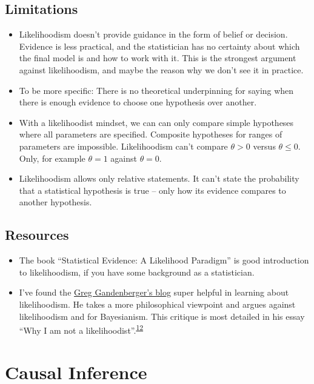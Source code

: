 \documentclass[
  10pt,
]{scrbook}
\providecommand{\tightlist}{%
  \setlength{\itemsep}{0pt}\setlength{\parskip}{0pt}}
\begin{document}
\hypertarget{limitations-3}{%
\section{Limitations}\label{limitations-3}}

\begin{itemize}
\tightlist
\item
  Likelihoodism doesn't provide guidance in the form of belief or decision. Evidence is less practical, and the statistician has no certainty about which the final model is and how to work with it. This is the strongest argument against likelihoodism, and maybe the reason why we don't see it in practice.
\item
  To be more specific: There is no theoretical underpinning for saying when there is enough evidence to choose one hypothesis over another.
\item
  With a likelihoodist mindset, we can can only compare simple hypotheses where all parameters are specified. Composite hypotheses for ranges of parameters are impossible. Likelihoodism can't compare \(\theta > 0\) versus \(\theta \leq 0\). Only, for example \(\theta = 1\) against \(\theta = 0\).
\item
  Likelihoodism allows only relative statements. It can't state the probability that a statistical hypothesis is true -- only how its evidence compares to another hypothesis.
\end{itemize}

\hypertarget{resources}{%
\section{Resources}\label{resources}}

\begin{itemize}
\tightlist
\item
  The book ``Statistical Evidence: A Likelihood Paradigm'' is good introduction to likelihoodism, if you have some background as a statistician.
\item
  I've found the \href{http://gandenberger.org/}{Greg Gandenberger's blog} super helpful in learning about likelihoodism. He takes a more philosophical viewpoint and argues against likelihoodism and for Bayesianism. This critique is most detailed in his essay ``Why I am not a likelihoodist''.\textsuperscript{\protect\hyperlink{ref-gandenberger2016not}{12}}
\end{itemize}

\hypertarget{causal-inference}{%
\chapter{Causal Inference}\label{causal-inference}}
\end{document}
